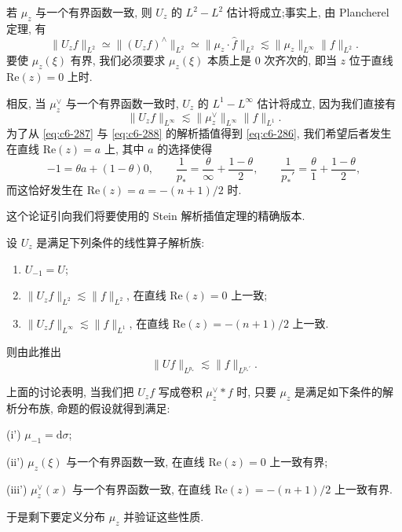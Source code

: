 若 $\mu_z$ 与一个有界函数一致, 则 $U_z$ 的 $L^2 - L^2$ 估计将成立;事实上, 由 Plancherel 定理, 有
\begin{equation}
\|U_z f\|_{L^2} \simeq \|(U_z f)^\wedge\|_{L^2} \simeq \|\mu_z \cdot \hat{f}\|_{L^2} \lesssim \|\mu_z\|_{L^\infty} \|f\|_{L^2}.\label{eq:c6-287}
\end{equation}
要使 $\mu_z(\xi)$ 有界, 我们必须要求 $\mu_z(\xi)$ 本质上是 0 次齐次的, 即当 $z$ 位于直线 $\mathrm{Re}(z) = 0$ 上时.

相反, 当 $\mu_z^\vee$ 与一个有界函数一致时, $U_z$ 的 $L^1 - L^\infty$ 估计将成立, 因为我们直接有
\begin{equation}
\|U_z f\|_{L^\infty} \lesssim \|\mu_z^\vee\|_{L^\infty} \|f\|_{L^1}.\label{eq:c6-288}
\end{equation}
为了从 \eqref{eq:c6-287} 与 \eqref{eq:c6-288} 的解析插值得到 \eqref{eq:c6-286}, 我们希望后者发生在直线 $\mathrm{Re}(z) = a$ 上, 其中 $a$ 的选择使得
\[
-1 = \theta a + (1-\theta) 0, \qquad \frac{1}{p_*} = \frac{\theta}{\infty} + \frac{1-\theta}{2}, \qquad \frac{1}{p_*'} = \frac{\theta}{1} + \frac{1-\theta}{2},
\]
而这恰好发生在 $\mathrm{Re}(z) = a = -(n+1)/2$ 时.

这个论证引向我们将要使用的 Stein 解析插值定理的精确版本.

\begin{proposition}\label{prop:c6-8.14}
设 $U_z$ 是满足下列条件的线性算子解析族:
\begin{enumerate}
\renewcommand{\labelenumi}{(\roman{enumi})}
\item $U_{-1} = U$;
\item $\|U_z f\|_{L^2} \lesssim \|f\|_{L^2}$, 在直线 $\mathrm{Re}(z) = 0$ 上一致;
\item $\|U_z f\|_{L^\infty} \lesssim \|f\|_{L^1}$, 在直线 $\mathrm{Re}(z) = -(n+1)/2$ 上一致.
\end{enumerate}
则由此推出
\[
\|Uf\|_{L^{p_*}} \lesssim \|f\|_{L^{p_*'}}.
\]
\end{proposition}


上面的讨论表明, 当我们把 $U_z f$ 写成卷积 $\mu_z^\vee * f$ 时, 只要 $\mu_z$ 是满足如下条件的解析分布族, 命题的假设就得到满足:

(i') $\mu_{-1} = \mathrm{d}\sigma$;

(ii') $\mu_z(\xi)$ 与一个有界函数一致, 在直线 $\mathrm{Re}(z) = 0$ 上一致有界;

(iii') $\mu_z^\vee(x)$ 与一个有界函数一致, 在直线 $\mathrm{Re}(z) = -(n+1)/2$ 上一致有界.

于是剩下要定义分布 $\mu_z$ 并验证这些性质.

